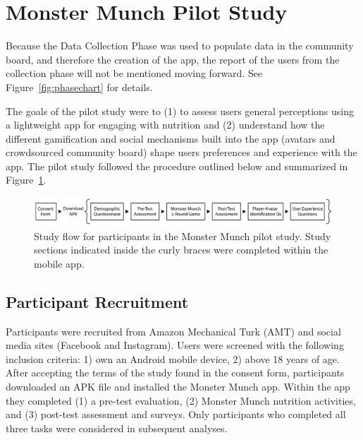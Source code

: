 \vspace{-5pt}
\section{Monster Munch Pilot Study}
Because the Data Collection Phase was used to populate data in the community board, and therefore the creation of the app, the report of the users from the collection phase will not be mentioned moving forward. See Figure~\ref{fig:phasechart} for details.

The goals of the pilot study were to (1) to assess users general perceptions using a lightweight app for engaging with nutrition and (2) understand how the different gamification and social mechanisms built into the app (avatars and crowdsourced community board) shape users preferences and experience with the app. The pilot study followed the procedure outlined below and summarized in Figure~\ref{fig:studyflow}. 


\begin{figure}[ht]
\includegraphics[width=\textwidth]{samples/images/figure-1.png}
\caption{Study flow for participants in the Monster Munch pilot study. Study sections indicated inside the curly braces were completed within the mobile app. }
\label{fig:studyflow}
\end{figure}

\vspace{-5pt}
\subsection{Participant Recruitment}
Participants were recruited from Amazon Mechanical Turk (AMT) and social media sites (Facebook and Instagram). Users were screened with the following inclusion criteria: 1) own an Android mobile device, 2) above 18 years of age. After accepting the terms of the study found in the consent form, participants  downloaded an APK file and installed the Monster Munch app. Within the app they completed (1) a pre-test evaluation, (2) Monster Munch nutrition activities, and (3) post-test assessment and surveys. Only participants who completed all three tasks were considered in subsequent analyses. 


